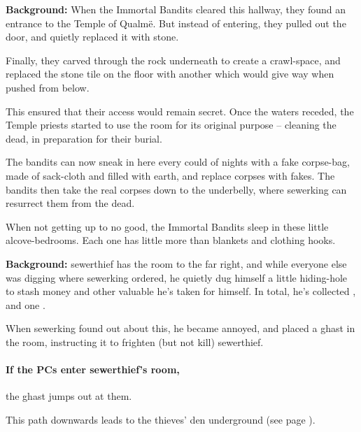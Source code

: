 
\textbf{Background:}
When the Immortal Bandits cleared this hallway, they found an entrance to the Temple of Qualm\"e.
But instead of entering, they pulled out the door, and quietly replaced it with stone.

Finally, they carved through the rock underneath to create a crawl-space, and replaced the stone tile on the floor with another which would give way when pushed from below.

This ensured that their access would remain secret.
Once the waters receded, the Temple priests started to use the room for its original purpose -- cleaning the dead, in preparation for their burial.

The bandits can now sneak in here every could of nights with a fake corpse-bag, made of sack-cloth and filled with earth, and replace corpses with fakes.
The bandits then take the real corpses down to the underbelly, where \gls{sewerking} can resurrect them from the dead.


When not getting up to no good, the Immortal Bandits sleep in these little alcove-bedrooms.
Each one has little more than blankets and clothing hooks.

\textbf{Background:}
\Gls{sewerthief} has the room to the far right, and while everyone else was digging where \gls{sewerking} ordered, he quietly dug himself a little hiding-hole to stash money and other valuable he's taken for himself.
In total, he's collected \lootMedium, and one \lootMagic.

When \gls{sewerking} found out about this, he became annoyed, and placed a ghast in the room, instructing it to frighten (but not kill) \gls{sewerthief}.

\paragraph{If the PCs enter \gls{sewerthief}'s room,}
the ghast jumps out at them.

\ghast

This path downwards leads to the thieves' den underground (see page \pageref{sewerPigWalk}).


